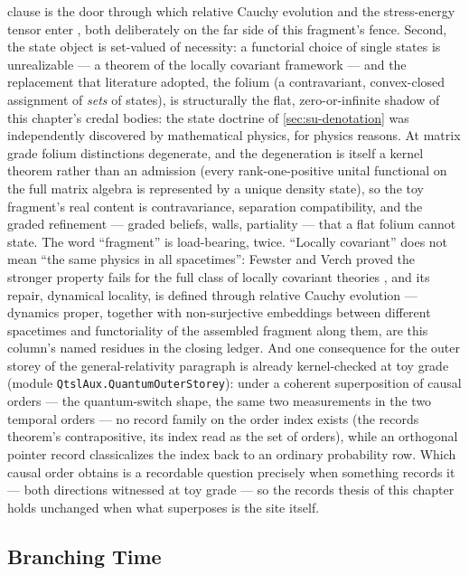 clause is the door through which relative Cauchy evolution and the
stress-energy tensor enter \cite{fewster15}, both deliberately on
the far side of this fragment's fence. Second, the state object is
set-valued of necessity: a functorial choice of single states is
unrealizable --- a theorem of the locally covariant framework
\cite{brunetti01} --- and the replacement that literature adopted,
the folium (a contravariant, convex-closed assignment of
\emph{sets} of states), is structurally the flat,
zero-or-infinite shadow of this chapter's credal bodies:
the state doctrine of \autoref{sec:su-denotation} was
independently discovered by mathematical physics, for physics
reasons. At matrix grade folium distinctions degenerate, and the
degeneration is itself a kernel theorem rather than an admission
(every rank-one-positive unital functional on the full matrix
algebra is represented by a unique density state), so the toy
fragment's real content is contravariance, separation
compatibility, and the graded refinement --- graded beliefs, walls,
partiality --- that a flat folium cannot state. The word
``fragment'' is load-bearing, twice. ``Locally covariant'' does not
mean ``the same physics in all spacetimes'': Fewster and Verch
proved the stronger property fails for the full class of locally
covariant theories \cite{fewster11}, and its repair, dynamical
locality, is defined through relative Cauchy evolution --- dynamics
proper, together with non-surjective embeddings between different
spacetimes and functoriality of the assembled fragment along them,
are this column's named residues in the closing ledger. And one
consequence for the outer storey of the general-relativity
paragraph is already kernel-checked at toy grade (module
\texttt{QtslAux.QuantumOuterStorey}): under a coherent
superposition of causal orders --- the quantum-switch shape, the
same two measurements in the two temporal orders --- no record
family on the order index exists (the records theorem's
contrapositive, its index read as the set of orders), while an
orthogonal pointer record classicalizes the index back to an
ordinary probability row. Which causal order obtains is a
recordable question precisely when something records it --- both
directions witnessed at toy grade --- so the records thesis of
this chapter holds unchanged when what superposes is the site
itself.

\subsection{Branching Time}
\label{sec:su-branching}

